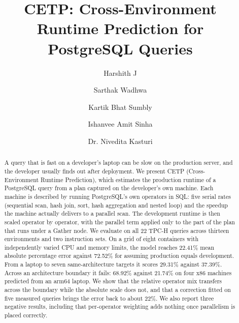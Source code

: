 \documentclass[runningheads]{llncs}
\begin{document}
\title{CETP: Cross-Environment Runtime Prediction for PostgreSQL Queries}


\author{Harshith J \and Sarthak Wadhwa \and Kartik Bhat Sumbly \and
Ishanvee Amit Sinha \and Dr. Nivedita Kasturi}



\maketitle

\begin{abstract}
A query that is fast on a developer's laptop can be slow on the production
server, and the developer usually finds out after deployment. We present CETP
(Cross-Environment Runtime Prediction), which estimates the production runtime
of a PostgreSQL query from a plan captured on the developer's own machine.
Each machine is described by running PostgreSQL's own operators in SQL: five
serial rates (sequential scan, hash join, sort, hash aggregation and nested
loop) and the speedup the machine actually delivers to a parallel scan. The
development runtime is then scaled operator by operator, with the parallel
term applied only to the part of the plan that runs under a Gather node. We
evaluate on all 22 TPC-H queries across thirteen environments and two
instruction sets. On a grid of eight containers with independently varied CPU
and memory limits, the model reaches 22.41\% mean absolute percentage error
against 72.52\% for assuming production equals development. From a laptop to
seven same-architecture targets it scores 29.31\% against 37.39\%. Across an
architecture boundary it fails: 68.92\% against 21.74\% on four x86 machines
predicted from an arm64 laptop. We show that the relative operator mix
transfers across the boundary while the absolute scale does not, and that a
correction fitted on five measured queries brings the error back to about
22\%. We also report three negative results, including that per-operator
weighting adds nothing once parallelism is placed correctly.

\end{abstract}
\end{document}
